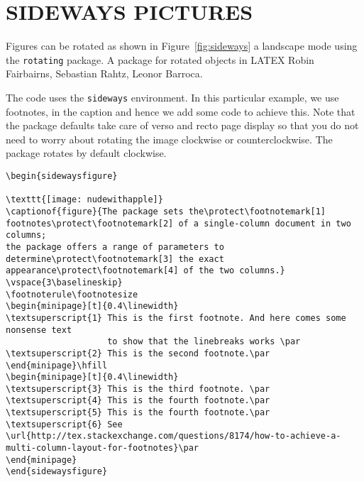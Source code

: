 \section{SIDEWAYS PICTURES}
Figures can be rotated as shown in Figure~\ref{fig:sideways}  a landscape mode using the \texttt{rotating} package. A package for rotated objects in LATEX
Robin Fairbairns, Sebastian Rahtz, Leonor Barroca.


The code uses the \verb!sideways! environment. In this particular example, we use footnotes, in the caption and hence we add some code to achieve this.  Note that the package defaults take care of verso and recto page display so that you do not need to   worry about rotating the image clockwise or counterclockwise. The package rotates by default clockwise.

\begin{tcolorbox}
\begin{lstlisting}
\begin{sidewaysfigure}

\texttt{[image: nudewithapple]}
\captionof{figure}{The package sets the\protect\footnotemark[1] footnotes\protect\footnotemark[2] of a single-column document in two columns;
the package offers a range of parameters to determine\protect\footnotemark[3] the exact appearance\protect\footnotemark[4] of the two columns.}
\vspace{3\baselineskip}
\footnoterule\footnotesize
\begin{minipage}[t]{0.4\linewidth}
\textsuperscript{1} This is the first footnote. And here comes some nonsense text
                    to show that the linebreaks works \par
\textsuperscript{2} This is the second footnote.\par
\end{minipage}\hfill
\begin{minipage}[t]{0.4\linewidth}
\textsuperscript{3} This is the third footnote. \par
\textsuperscript{4} This is the fourth footnote.\par
\textsuperscript{5} This is the fourth footnote.\par
\textsuperscript{6} See \url{http://tex.stackexchange.com/questions/8174/how-to-achieve-a-multi-column-layout-for-footnotes}\par
\end{minipage}
\end{sidewaysfigure}
\end{lstlisting}
\end{tcolorbox}


